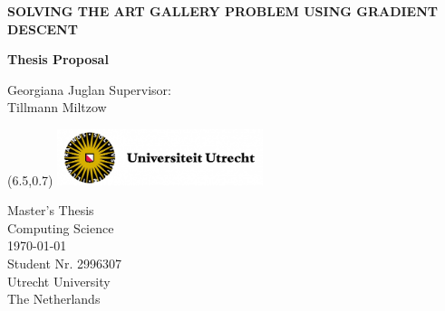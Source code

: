 \documentclass{article}
\begin{document}
\nocite{*} %

\thispagestyle{empty} 
\begin{center}
    \vspace*{0.5cm}
    \huge
    \textbf{SOLVING THE ART GALLERY PROBLEM USING GRADIENT DESCENT}

    \vspace*{0.4cm}
    \textbf{Thesis Proposal }
    \vspace*{2cm}




    \vspace{-1cm}
    \LARGE
    Georgiana Juglan
    \vfill 
    \large    
    Supervisor:\\
    Tillmann Miltzow \\
     
\end{center}
   

\begin{textblock}{3}(6.5,0.7)
\includegraphics[width = 6cm]{Figures/UU logo.png}
\end{textblock}

\begin{flushleft}
    \vspace{0.5cm}
    Master's Thesis \\
    Computing Science\\
    \today\\
    Student Nr. 2996307 \\
    Utrecht University\\
    The Netherlands
\end{flushleft}

\newpage
\thispagestyle{empty}

\thispagestyle{empty}
\tableofcontents
\thispagestyle{empty}

% 
% 
% 
% 
% 

\renewcommand{\headrulewidth}{0pt}%
\fancyhead{}%




%
\end{document}

